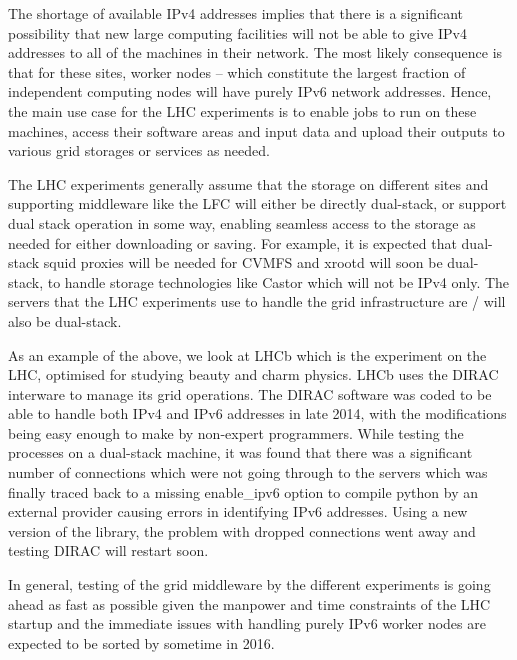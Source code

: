 

The shortage of available IPv4 addresses implies that there is a significant possibility that new large
computing facilities will not be able to give IPv4 addresses to all of the machines in their network. The
most likely consequence is that for these sites, worker nodes -- which constitute the largest fraction of
independent computing nodes will have purely IPv6 network addresses. Hence, the main use case for the LHC
experiments is to enable jobs to run on these machines, access their software areas and input data and
upload their outputs to various grid storages or services as needed.

The LHC experiments generally assume \cite{LHCassumption} that the storage on different sites and
supporting middleware \cite{middleware} like the LFC will either be directly dual-stack, or support
dual stack operation in some way, enabling seamless access to the storage as needed for either downloading
or saving. For example, it is expected that dual-stack squid proxies will be needed for CVMFS and xrootd
will soon be dual-stack, to handle storage technologies like Castor which will not be IPv4 only. The
servers that the LHC experiments use to handle the grid infrastructure are / will also be dual-stack.

As an example of the above, we look at LHCb \cite{LHCb} which is the experiment on the LHC, optimised
for studying beauty and charm physics. LHCb uses the DIRAC \cite{DIRAC}interware to manage its grid
operations. The DIRAC software was coded to be able to handle both IPv4 and IPv6 addresses in late 2014,
with the modifications being easy enough to make by non-expert programmers. While testing the processes
on a dual-stack machine, it was found that there was a significant number of connections which were not
going through to the servers which was finally traced back to a missing enable\_ipv6 option to compile python
by an external provider causing errors in identifying IPv6 addresses. Using a new version of the library, the
problem with dropped connections went away and testing DIRAC will restart soon.

In general, testing of the grid middleware by the different experiments is going ahead as fast as possible
given the manpower and time constraints of the LHC startup and the immediate issues with handling purely
IPv6 worker nodes are expected to be sorted by sometime in 2016.


